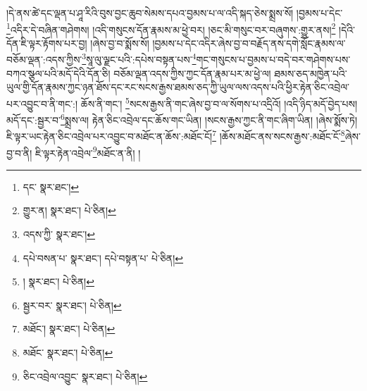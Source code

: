 །དེ་ནས་ཚེ་དང་ལྡན་པ་ཤཱ་རིའི་བུས་བྱང་ཆུབ་སེམས་དཔའ་བྱམས་པ་ལ་འདི་སྐད་ཅེས་སྨྲས་སོ། །བྱམས་པ་དེང་\footnote{དང་  སྣར་ཐང་། }འདིར་དེ་བཞིན་གཤེགས། །འདི་གསུངས་དོན་རྣམས་མ་ཕྱེ་བར། །ཅང་མི་གསུང་བར་བཞུགས་:གྱུར་ནས།\footnote{གྱུར་ན།  སྣར་ཐང་།  པེ་ཅིན། } །དེའི་དོན་ཇི་ལྟར་རྟོགས་པར་བྱ། །ཞེས་བྱ་བ་སྨོས་སོ། །བྱམས་པ་དེང་འདིར་ཞེས་བྱ་བ་བརྗོད་ནས་དགེ་སློང་རྣམས་ལ་བཅོམ་ལྡན་:འདས་ཀྱིས་\footnote{འདས་ཀྱི་  སྣར་ཐང་། }སཱ་ལུ་ལྗང་པའི་:དཔེས་བསྟན་པས་\footnote{དཔེ་བསན་པ་  སྣར་ཐང་། དཔེ་བསྟན་པ་  པེ་ཅིན། }གང་གསུངས་པ་བྱམས་པ་བདེ་བར་གཤེགས་པས་བཀའ་སྩལ་པའི་མདོ་དེའི་དོན་ཅི། བཅོམ་ལྡན་འདས་ཀྱིས་ཀྱང་དོན་རྣམ་པར་མ་ཕྱེ་ལ། ཐམས་ཅད་མཁྱེན་པའི་ཡུལ་གྱི་དོན་རྣམས་ཀྱང་ཉན་ཐོས་དང་རང་སངས་རྒྱས་ཐམས་ཅད་ཀྱི་ཡུལ་ལས་འདས་པའི་ཕྱིར་རྟེན་ཅིང་འབྲེལ་པར་འབྱུང་བ་ནི་གང་:། ཆོས་ནི་གང་། \footnote{།    སྣར་ཐང་།  པེ་ཅིན། }སངས་རྒྱས་ནི་གང་ཞེས་བྱ་བ་ལ་སོགས་པ་འདྲིའོ། །འདི་ཉིད་མདོ་བྱེད་པས། མདོ་དང་:སྦྱར་བ་\footnote{སྦྱར་བར་  སྣར་ཐང་།  པེ་ཅིན། }སྨྲས་ལ། རྟེན་ཅིང་འབྲེལ་དང་ཆོས་གང་ཡིན། །སངས་རྒྱས་ཀྱང་ནི་གང་ཞིག་ཡིན། །ཞེས་སྨོས་ཏེ། ཇི་ལྟར་ཡང་རྟེན་ཅིང་འབྲེལ་པར་འབྱུང་བ་མཐོང་ན་ཆོས་:མཐོང་ངོ།\footnote{མཐོང་།  སྣར་ཐང་།  པེ་ཅིན། } །ཆོས་མཐོང་ནས་སངས་རྒྱས་:མཐོང་ངོ་\footnote{མཐོང་  སྣར་ཐང་།  པེ་ཅིན། }ཞེས་བྱ་བ་ནི། ཇི་ལྟར་རྟེན་འབྲེལ་\footnote{ཅིང་འབྲེལ་འབྱུང་  སྣར་ཐང་།  པེ་ཅིན། }མཐོང་ན་ནི། །
